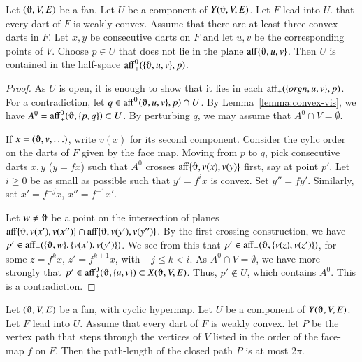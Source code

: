 \begin{lemma}
Let $(\orgn,V,E)$ be a fan.  
Let $U$ be a component of $Y(\orgn,V,E)$.
Let $F$ lead into $U$.
that every dart of $F$ is weakly convex. Assume that there
are at least three convex darts in $F$.  Let $x,y$
be consecutive darts on $F$ and let $u,v$ be the corresponding points of $V$.
Choose $p\in U$ that does not lie in the plane $\op{aff}\{\orgn,u,v\}$.
Then $U$
is contained in the half-space $\op{aff}_+^0(\{\orgn,u,v\},p)$.
\end{lemma}

\begin{proof} As $U$ is open, it is enough to show that it lies
in each ${\operatorname{aff}}_+(\{orgn,u,v\},p)$.  For a contradiction, let
$q\in \op{aff}_-^0(\orgn,u,v\},p)\cap U$. 
 By Lemma~\ref{lemma:convex-vis},
we have $A^0=\op{aff}_+^0(\orgn,\{p,q\})\subset U$. 
By perturbing $q$, we may assume that $A^0\cap V=\emptyset$. 

If $x=(\orgn,v,\ldots)$, write $v(x)$ for its second component.
Consider the cylic order on the darts of $F$ given by the face map.
Moving from $p$ to
$q$, pick consecutive darts $x,y$ ($y = f x$) 
such that $A^0$ crosses $\op{aff}\{\orgn,v(x),v(y)\}$ first, say at point $p'$. Let $i\ge0$ be as small as possible such that $y'=f^i x$ is
convex.  Set $y'' = f y'$.  Similarly, set $x' = f^{-j} x$, $x'' = f^{-1} x'$.

Let $w\ne\orgn$ be a point on the intersection of planes $\op{aff}\{\orgn,v(x'),v(x'')\}\cap \op{aff}\{\orgn,v(y'),v(y'')\}$.
By the first crossing construction,
we have $p'\in \op{aff}_+(\{\orgn,w\},\{v(x'),v(y')\})$.  
We see from this
that $p'\in\op{aff}_+(\orgn,\{v(z),v(z')\})$,
for some $z = f^k x$, $z' = f^{k+1}x$, with $-j \le k< i$. 
As $A^0\cap V=\emptyset$,
we have more strongly that $p'\in\op{aff}_+^0(\orgn,\{u,v\})\subset X(\orgn,V,E)$.
Thus, $p'\not\in U$, which contains $A^0$.  This is a contradiction.
\end{proof}


\begin{lemma}
Let $(\orgn,V,E)$ be a fan, with cyclic hypermap.  
Let $U$ be a component of $Y(\orgn,V,E)$.  Let $F$ lead
into $U$.
Assume
that every dart of $F$ is weakly convex. 
let $P$ be the vertex path that steps through the vertices of $V$ listed
in the order of the face-map $f$ on $F$.  Then the path-length of the closed
path $P$ is at most $2\pi$.
\end{lemma}

